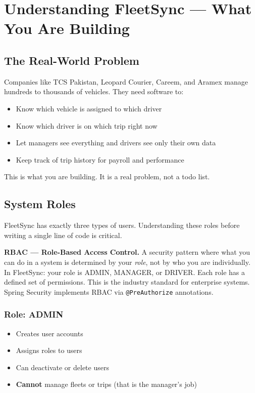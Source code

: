 \documentclass[12pt,a4paper]{report}
\newcommand{\code}[1]{\texttt{\textcolor{keywordblue}{#1}}}
\begin{document}
\chapter{Understanding FleetSync — What You Are Building}

\section{The Real-World Problem}

Companies like TCS Pakistan, Leopard Courier, Careem, and Aramex manage hundreds to thousands of vehicles. They need software to:

\begin{itemize}
  \item Know which vehicle is assigned to which driver
  \item Know which driver is on which trip right now
  \item Let managers see everything and drivers see only their own data
  \item Keep track of trip history for payroll and performance
\end{itemize}

This is what you are building. It is a real problem, not a todo list.

\section{System Roles}

FleetSync has exactly three types of users. Understanding these roles before writing a single line of code is critical.

\begin{tcolorbox}[notebox]
\textbf{RBAC --- Role-Based Access Control.} A security pattern where what you can do in a system is determined by your \textit{role}, not by who you are individually. In FleetSync: your role is ADMIN, MANAGER, or DRIVER. Each role has a defined set of permissions. This is the industry standard for enterprise systems. Spring Security implements RBAC via \code{@PreAuthorize} annotations.
\end{tcolorbox}

\subsection{Role: ADMIN}
\begin{itemize}
  \item Creates user accounts
  \item Assigns roles to users
  \item Can deactivate or delete users
  \item \textbf{Cannot} manage fleets or trips (that is the manager's job)
\end{itemize}
\end{document}
